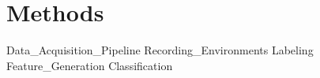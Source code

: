 \chapter{Methods} \label{ch:methods}


{Data_Acquisition_Pipeline}
{Recording_Environments}
{Labeling}
{Feature_Generation}
{Classification}